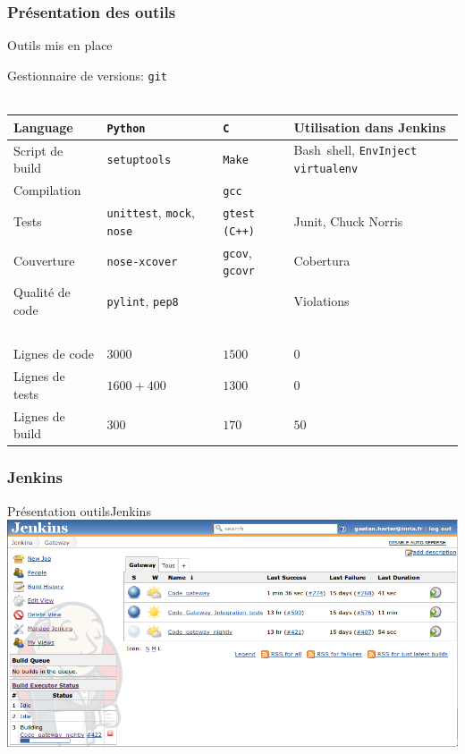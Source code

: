 \documentclass[9pt]{beamer}
\begin{document}
\subsubsection{Présentation des outils}
\begin{frame}{Outils mis en place}

  Gestionnaire de versions: \texttt{git} \\ ~ \\

  \begin{tabular}{ l | l l | p{3.5cm} }
    Language         & \texttt{Python}     & \texttt{C}    & Utilisation dans Jenkins \\ \hline
    Script de build  & \texttt{setuptools} & \texttt{Make} & Bash~shell, \texttt{EnvInject} \texttt{virtualenv}\\
    Compilation      & ~                   & \texttt{gcc}  & ~ \\
    Tests            & \texttt{unittest}, \texttt{mock}, \texttt{nose}
                     & \texttt{gtest} \texttt{(C++)}
                     & Junit, Chuck Norris\\
    Couverture       & \texttt{nose-xcover}
                     & \texttt{gcov}, \texttt{gcovr}
                     & Cobertura \\
   Qualité de code  & \texttt{pylint}, \texttt{pep8} & ~  & Violations \\
    ~ & ~  & ~ & \\
    Lignes de code   &  $3000$        &  $1500$  &  $0$  \\
    Lignes de tests  &  $1600 + 400$  &  $1300$  &  $0$  \\
    Lignes de build  &  $300$         &  $170$   &  $50$ \\

  \end{tabular}
\end{frame}


\subsubsection{Jenkins}
\begin{frame}{Présentation outils}{Jenkins}
  \includegraphics[width=\linewidth]{images/jenkins}
\end{frame}
\end{document}
